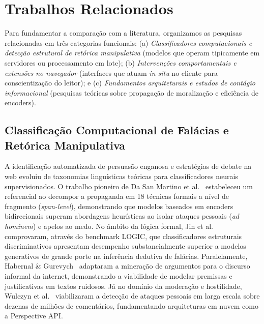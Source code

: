 \documentclass[runningheads]{llncs}
\begin{document}
\section{Trabalhos Relacionados}

Para fundamentar a comparação com a literatura, organizamos as pesquisas relacionadas em três categorias funcionais: (a) \textit{Classificadores computacionais e detecção estrutural de retórica manipulativa} (modelos que operam tipicamente em servidores ou processamento em lote); (b) \textit{Intervenções comportamentais e extensões no navegador} (interfaces que atuam \textit{in-situ} no cliente para conscientização do leitor); e (c) \textit{Fundamentos arquiteturais e estudos de contágio informacional} (pesquisas teóricas sobre propagação de moralização e eficiência de encoders).

\subsection{Classificação Computacional de Falácias e Retórica Manipulativa}

A identificação automatizada de persuasão enganosa e estratégias de debate na web evoluiu de taxonomias linguísticas teóricas para classificadores neurais supervisionados. O trabalho pioneiro de Da San Martino et al.~\cite{dasanmartino2019fine} estabeleceu um referencial ao decompor a propaganda em 18 técnicas formais a nível de fragmento (\textit{span-level}), demonstrando que modelos baseados em encoders bidirecionais superam abordagens heurísticas ao isolar ataques pessoais (\textit{ad hominem}) e apelos ao medo. No âmbito da lógica formal, Jin et al.~\cite{jin2022logical} comprovaram, através do benchmark LOGIC, que classificadores estruturais discriminativos apresentam desempenho substancialmente superior a modelos generativos de grande porte na inferência dedutiva de falácias. Paralelamente, Habernal \& Gurevych~\cite{habernal2017argumentation} adaptaram a mineração de argumentos para o discurso informal da internet, demonstrando a viabilidade de modelar premissas e justificativas em textos ruidosos. Já no domínio da moderação e hostilidade, Wulczyn et al.~\cite{wulczyn2017ex} viabilizaram a detecção de ataques pessoais em larga escala sobre dezenas de milhões de comentários, fundamentando arquiteturas em nuvem como a Perspective API.
\end{document}
